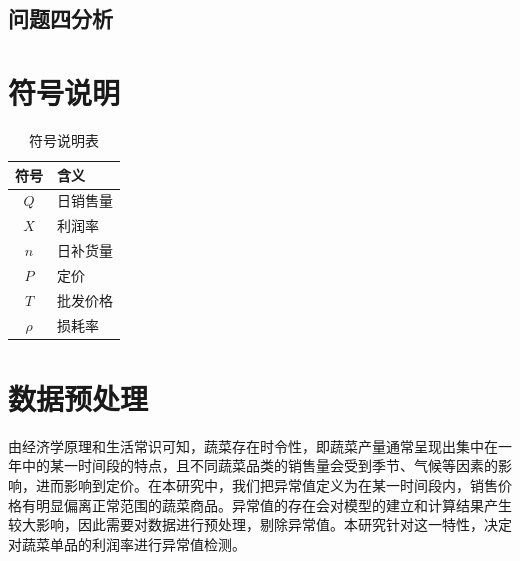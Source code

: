 \documentclass{article}
\begin{document}
\subsection{问题四分析}

\section{符号说明}
\begin{table}[H]
\centering
\caption{符号说明表}
\begin{tabular}{|c|l|}
\hline
符号 & 含义 \\
\hline
$Q$ & 日销售量 \\
$X$ & 利润率 \\
$n$ & 日补货量 \\
$P$ & 定价 \\
$T$ & 批发价格 \\
$\rho$ & 损耗率 \\
\hline
\end{tabular}
\end{table}
\section{数据预处理}

由经济学原理和生活常识可知，蔬菜存在时令性，即蔬菜产量通常呈现出集中在一年中的某一时间段的特点，且不同蔬菜品类的销售量会受到季节、气候等因素的影响，进而影响到定价。在本研究中，我们把异常值定义为在某一时间段内，销售价格有明显偏离正常范围的蔬菜商品。异常值的存在会对模型的建立和计算结果产生较大影响，因此需要对数据进行预处理，剔除异常值。本研究针对这一特性，决定对蔬菜单品的利润率进行异常值检测。
\end{document}
